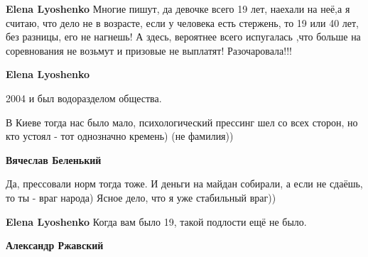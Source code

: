 \begin{itemize}
\begin{itemize}
 
\textbf{Elena Lyoshenko} Многие пишут, да девочке всего 19 лет, наехали на
неё,а я считаю, что дело не в возрасте, если у человека есть стержень, то 19
или 40 лет, без разницы, его не нагнешь! А здесь, вероятнее всего испугалась
,что больше на соревнования не возьмут и призовые не выплатят! Разочаровала!!!

 
\textbf{Elena Lyoshenko}

2004 и был водоразделом общества.

В Киеве тогда нас было мало, психологический прессинг шел со всех сторон, но
кто устоял - тот однозначно кремень) (не фамилия))


 

\textbf{Вячеслав Беленький}

Да, прессовали норм тогда тоже. И деньги на майдан собирали, а если не сдаёшь,
то ты - враг народа) Ясное дело, что я уже стабильный враг))


 
\textbf{Elena Lyoshenko}
Когда вам было 19, такой подлости ещё не было.

 

\textbf{Александр Ржавский}


\end{itemize}
\end{itemize}
